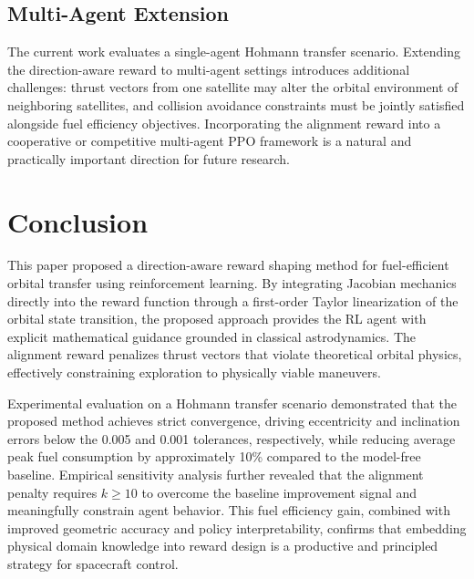 \documentclass[paper]{ieice}
\begin{document}
\subsection{Multi-Agent Extension}
The current work evaluates a single-agent Hohmann transfer scenario. Extending the direction-aware reward to multi-agent settings introduces additional challenges: thrust vectors from one satellite may alter the orbital environment of neighboring satellites, and collision avoidance constraints must be jointly satisfied alongside fuel efficiency objectives. Incorporating the alignment reward into a cooperative or competitive multi-agent PPO framework \cite{terry2021pettingzoo} is a natural and practically important direction for future research.

\section{Conclusion}
\label{Conclusion}

This paper proposed a direction-aware reward shaping method for fuel-efficient orbital transfer using reinforcement learning. By integrating Jacobian mechanics directly into the reward function through a first-order Taylor linearization of the orbital state transition, the proposed approach provides the RL agent with explicit mathematical guidance grounded in classical astrodynamics. The alignment reward penalizes thrust vectors that violate theoretical orbital physics, effectively constraining exploration to physically viable maneuvers.

Experimental evaluation on a Hohmann transfer scenario demonstrated that the proposed method achieves strict convergence, driving eccentricity and inclination errors below the 0.005 and 0.001 tolerances, respectively, while reducing average peak fuel consumption by approximately 10\% compared to the model-free baseline. Empirical sensitivity analysis further revealed that the alignment penalty requires $k \geq 10$ to overcome the baseline improvement signal and meaningfully constrain agent behavior. This fuel efficiency gain, combined with improved geometric accuracy and policy interpretability, confirms that embedding physical domain knowledge into reward design is a productive and principled strategy for spacecraft control.

\end{document}
